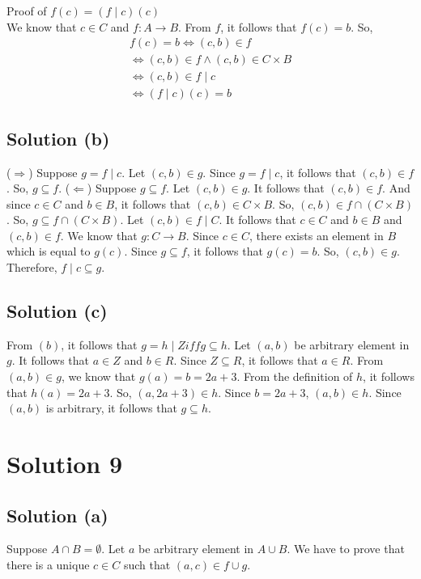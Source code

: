 \documentclass{article}
\begin{document}
Proof of $f(c) = (f \mid c)(c)$ \\
We know that $c \in C$ and $f : A \to B$. From $f$, it follows that
$f(c) = b$. So,
\begin{align*}
  f(c) = b \iff (c,b) \in f \\
  \iff (c,b) \in f \land (c,b) \in C \times B \\
  \iff (c,b) \in f \mid c \\
  \iff (f \mid c)(c) = b 
\end{align*}

\subsection{Solution (b)}
($\Rightarrow$) Suppose $g = f \mid c$. Let $(c,b) \in g$. Since $g = f
\mid c$, it follows that $(c,b) \in f$. So, $g \subseteq f$.
($\Leftarrow$) Suppose $g \subseteq f$. Let $(c,b) \in g$. It follows
that $(c,b) \in f$. And since $c \in C$ and $b \in B$, it follows that
$(c,b) \in C \times B$. So, $(c,b) \in f \cap (C \times B)$. So, $g
\subseteq f \cap (C \times B)$. Let $(c,b) \in f \mid C$. It follows
that $c \in C$ and $b \in B$ and $(c,b) \in f$. We know that $g: C \to
B$. Since $c \in C$, there exists an element in $B$ which is equal to
$g(c)$. Since $g \subseteq f$, it follows that $g(c) = b$. So, $(c,b)
\in g$. Therefore, $f \mid c \subseteq g$.

\subsection{Solution (c)}
From $(b)$, it follows that $g = h\mid Z iff g \subseteq h$. Let
$(a,b)$ be arbitrary element in $g$. It follows that $a \in Z$ and $b
\in R$. Since $Z \subseteq R$, it follows that $a \in R$. From $(a,b)
\in g$, we know that $g(a) = b = 2a + 3$. From the definition of $h$,
it follows that $h(a) = 2a + 3$. So, $(a,2a + 3) \in h$. Since $b = 2a
+ 3$, $(a,b) \in h$. Since $(a,b)$ is arbitrary, it follows that $g
\subseteq h$.

\section{Solution 9}
\subsection{Solution (a)}
Suppose $A \cap B = \emptyset$. Let $a$ be arbitrary element in $A
\cup B$. We have to prove that there is a unique $c \in C$ such that
$(a,c) \in f \cup g$.
\end{document}
